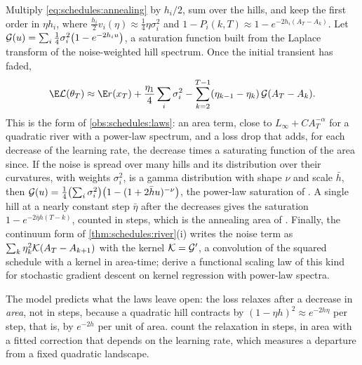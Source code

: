 \begin{refsection}
\begin{heuristic}
Multiply \eqref{eq:schedules:annealing} by $h_i/2$, sum over the hills, and keep the first order in $\eta h_i$, where $\frac{h_i}2v_i(\eta)\approx\frac14\eta\sigma_i^2$ and $1-P_i(k,T)\approx1-e^{-2h_i(A_T-A_k)}$. Let $\mathcal{G}(u)=\sum_i\frac14\sigma_i^2\bigl(1-e^{-2h_iu}\bigr)$, a saturation function built from the Laplace transform of the noise-weighted hill spectrum. Once the initial transient has faded,
\begin{equation}\label{eq:schedules:law}
  \E\Loss(\theta_T)\approx\E r(x_T)+\frac{\eta_1}4\sum_i\sigma_i^2-\sum_{k=2}^{T-1}(\eta_{k-1}-\eta_k)\,\schedulesG(A_T-A_k).
\end{equation}
This is the form of \cref{obs:schedules:laws}: an area term, close to $L_\infty+CA_T^{-\alpha}$ for a quadratic river with a power-law spectrum, and a loss drop that adds, for each decrease of the learning rate, the decrease times a saturating function of the area since. If the noise is spread over many hills and its distribution over their curvatures, with weights $\sigma_i^2$, is a gamma distribution with shape $\nu$ and scale $\bar h$, then $\mathcal{G}(u)=\frac14\bigl(\sum_i\sigma_i^2\bigr)\bigl(1-(1+2\bar hu)^{-\nu}\bigr)$, the power-law saturation of \textcite{LuoEtAl2025}. A single hill at a nearly constant step $\bar\eta$ after the decreases gives the saturation $1-e^{-2\bar\eta h(T-k)}$, counted in steps, which is the annealing area of \textcite{TissueEtAl2025}. Finally, the continuum form of \cref{thm:schedules:river}(i) writes the noise term as $\sum_k\eta_k^2\mathcal{K}(A_T-A_{k+1})$ with the kernel $\mathcal{K}=\mathcal{G}'$, a convolution of the squared schedule with a kernel in area-time; \textcite{LiEtAl2025} derive a functional scaling law of this kind for stochastic gradient descent on kernel regression with power-law spectra.\qedhere
\end{heuristic}

The model predicts what the laws leave open: the loss relaxes after a decrease in \emph{area}, not in steps, because a quadratic hill contracts by $(1-\eta h)^2\approx e^{-2h\eta}$ per step, that is, by $e^{-2h}$ per unit of area. \Textcite{TissueEtAl2025} count the relaxation in steps, \textcite{LuoEtAl2025} in area with a fitted correction that depends on the learning rate, which measures a departure from a fixed quadratic landscape.


\end{refsection}
